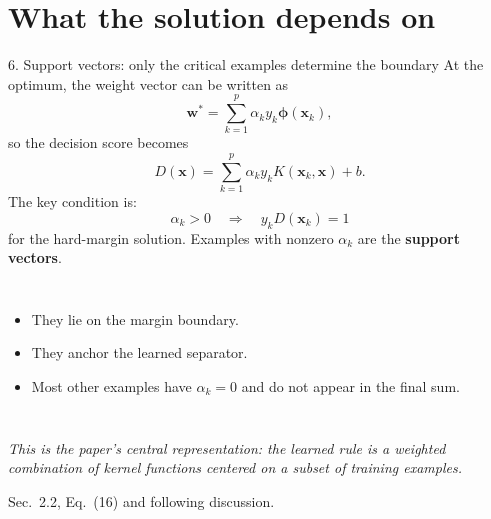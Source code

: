 \documentclass[10pt,compress]{beamer}
\newcommand{\x}{\bm{x}}
\newcommand{\w}{\bm{w}}
\newcommand{\phiX}{\bm{\phi}}
\newcommand{\defline}[1]{{\footnotesize\textcolor{aggiemaroon}{\textit{#1}}\par}}
\begin{document}
\section[Support vectors]{What the solution depends on}
\begin{frame}{6. Support vectors: only the critical examples determine the boundary}\footnotesize
At the optimum, the weight vector can be written as
\[
\w^*=\sum_{k=1}^{p}\alpha_k y_k\phiX(\x_k),
\]
so the decision score becomes
\[
D(\x)=\sum_{k=1}^{p}\alpha_k y_k K(\x_k,\x)+b.
\]
The key condition is:
\[
\alpha_k>0 \quad\Longrightarrow\quad y_kD(\x_k)=1
\]
for the hard-margin solution. Examples with nonzero $\alpha_k$ are the \textbf{support vectors}.
\begin{columns}[T]
\begin{itemize}\small
\item They lie on the margin boundary.
\item They anchor the learned separator.
\item Most other examples have $\alpha_k=0$ and do not appear in the final sum.
\end{itemize}
\begin{center}
\end{center}
\end{columns}
\defline{This is the paper's central representation: the learned rule is a weighted combination of kernel functions centered on a subset of training examples.}
{\scriptsize Sec.~2.2, Eq.~(16) and following discussion.}
\end{frame}
\end{document}
